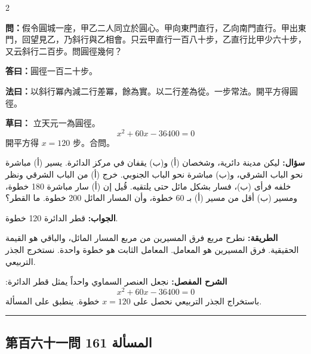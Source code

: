 \documentclass[11pt,a4paper]{article}
\newcommand{\ar}[1]{\arabicfont\beginR #1\endR}
\newcommand{\arb}[1]{\textbf{\arabicfont\beginR #1\endR}}
\newcommand{\longline}{\noindent\rule{\textwidth}{0.4pt}}
\newcommand{\arnote}[1]{\textcolor{arabicblue}{\ar{#1}}}
\newcommand{\wen}[1]{\par\noindent\textbf{\textcolor{probcolor}{問：}}{#1}\par}
\newcommand{\da}[1]{\par\noindent\textbf{\textcolor{anscolor}{答曰：}}{#1}\par}
\newcommand{\fayue}[1]{\par\noindent\textbf{\textcolor{methodcolor}{法曰：}}{#1}\par}
\newcommand{\caoyue}[1]{\par\noindent\textbf{草曰：}{#1}\par}
\newcommand{\arwen}[1]{\par\noindent\arb{سؤال: }\arnote{#1}\par}
\newcommand{\arjwb}[1]{\par\noindent\arb{الجواب: }\arnote{#1}\par}
\newcommand{\arqwd}[1]{\par\noindent\arb{الطريقة: }\arnote{#1}\par}
\newcommand{\arshr}[1]{\par\noindent\arb{الشرح المفصل: }\arnote{#1}\par}
\begin{document}
\begin{paracol}{2}

\begin{leftcolumn}
\wen{假令圓城一座，甲乙二人同立於圓心。甲向東門直行，乙向南門直行。甲出東門，回望見乙，乃斜行與乙相會。只云甲直行一百八十步，乙直行比甲少六十步，又云斜行二百步。問圓徑幾何？}

\da{圓徑一百二十步。}

\fayue{以斜行冪內減二行差冪，餘為實。以二行差為從。一步常法。開平方得圓徑。}

\caoyue{
立天元一為圓徑。
$$x^2 + 60x - 36400 = 0$$
開平方得 $x = 120$ 步。合問。}
\end{leftcolumn}

\begin{rightcolumn}
\arwen{ليكن مدينة دائرية، وشخصان (أ) و(ب) يقفان في مركز الدائرة. يسير (أ) مباشرة نحو الباب الشرقي، و(ب) مباشرة نحو الباب الجنوبي. خرج (أ) من الباب الشرقي ونظر خلفه فرأى (ب)، فسار بشكل مائل حتى يلتقيه. قُيل إن (أ) سار مباشرة 180 خطوة، ومسير (ب) أقل من مسير (أ) بـ 60 خطوة، وأن المسار المائل 200 خطوة. ما القطر؟}

\arjwb{قطر الدائرة 120 خطوة.}

\arqwd{نطرح مربع فرق المسيرين من مربع المسار المائل، والباقي هو القيمة الحقيقية. فرق المسيرين هو المعامل. المعامل الثابت هو خطوة واحدة. نستخرج الجذر التربيعي.}

\arshr{نجعل العنصر السماوي واحداً يمثل قطر الدائرة:
$$x^2 + 60x - 36400 = 0$$
باستخراج الجذر التربيعي نحصل على $x = 120$ خطوة. ينطبق على المسألة.}
\end{rightcolumn}

\end{paracol}

\vspace{0.3cm}
\longline

\subsection*{第百六十一問 \hfill \ar{المسألة 161}}
\end{document}
